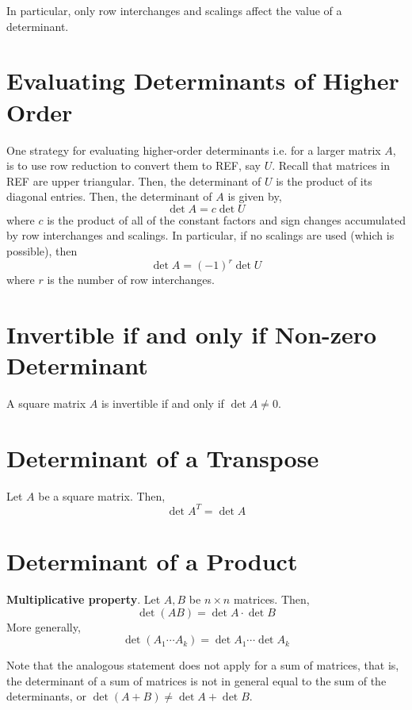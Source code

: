 \documentclass[letterpaper,12pt]{article}
\begin{document}
In particular, only row interchanges and scalings affect the value of a determinant.

\section*{Evaluating Determinants of Higher Order}
One strategy for evaluating higher-order determinants i.e. for a larger matrix $A$, is to use row reduction to convert them to REF, say $U$. Recall that matrices in REF are upper triangular. Then, the determinant of $U$ is the product of its diagonal entries. Then, the determinant of $A$ is given by,
\begin{equation*}
    \det{A} = c \det{U}
\end{equation*}
where $c$ is the product of all of the constant factors and sign changes accumulated by row interchanges and scalings. In particular, if no scalings are used (which is possible), then
\begin{equation*}
    \det{A} = (-1)^r \det{U}
\end{equation*}
where $r$ is the number of row interchanges.

\section*{Invertible if and only if Non-zero Determinant}
\begin{theorem}
A square matrix $A$ is invertible if and only if $\det{A} \neq 0$.
\end{theorem}



\section*{Determinant of a Transpose}
\begin{theorem}
Let $A$ be a square matrix. Then,
\begin{equation*}
    \boxed{\det{A^T} = \det{A}}
\end{equation*}
\end{theorem}

\section*{Determinant of a Product}

\begin{theorem}
\textbf{Multiplicative property}. Let $A, B$ be $n \times n$ matrices. Then,
\begin{equation*}
    \boxed{\det{(AB)} = \det{A} \cdot \det{B}}
\end{equation*}
More generally,
\begin{equation*}
    \boxed{\det{(A_1 \cdots A_k)} = \det{A_1} \cdots \det{A_k}}
\end{equation*}
\end{theorem}


Note that the analogous statement does not apply for a sum of matrices, that is, the determinant of a sum of matrices is not in general equal to the sum of the determinants, or $\det{(A + B)} \neq \det{A} + \det{B}$.
\end{document}
